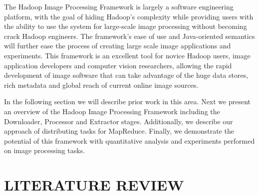 The Hadoop Image Processing Framework is largely a software
engineering platform, with the goal of hiding Hadoop's complexity
while providing users with the ability to use the system for
large-scale image processing without becoming crack Hadoop engineers.
The framework's ease of use and Java-oriented semantics will further
ease the process of creating large scale image applications and
experiments. This framework is an excellent tool for novice Hadoop
users, image application developers and computer vision researchers,
allowing the rapid development of image software that can take
advantage of the huge data stores, rich metadata and global reach of
current online image sources.%

In the following section we will describe prior work in this
area. Next we present an overview of the Hadoop Image Processing
Framework including the Downloader, Processor and Extractor
stages. Additionally, we describe our approach of distributing tasks
for MapReduce. Finally, we demonstrate the potential of this framework
with quantitative analysis and experiments performed on image
processing tasks.
\chapter{LITERATURE REVIEW}
